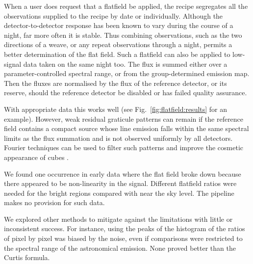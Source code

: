 \documentclass[a4paper,fleqn,usenatbib]{mnras}
\begin{document}
When a user does request that a flatfield be applied, the recipe
segregates all the observations supplied to the recipe by date or
individually.  Although the detector-to-detector response has been
known to vary during the course of a night, far more often it is
stable.  Thus combining observations, such as the two directions of a
weave, or any repeat observations through a night, permits a better
determination of the flat field.  Such a flatfield can also be applied
to low-signal data taken on the same night too.  The flux is summed
either over a parameter-controlled spectral range, or from the
group-determined emission map.  Then the fluxes are normalised by the
flux of the reference detector, or its reserve, should the reference
detector be disabled or has failed quality assurance.

With appropriate data this works well (see
Fig.~\ref{fig:flatfield:results} for an example).  However, weak
residual graticule patterns can remain if the reference field contains
a compact source whose line emission falls within the same spectral
limits as the flux summation and is not observed uniformly by all
detectors.  Fourier techniques can be used to filter such patterns and
improve the cosmetic appearance of cubes \citep{2015MNRAS.447.1996W}.

We found one occurrence in early data where the flat field broke down
because there appeared to be non-linearity in the signal.  Different
flatfield ratios were needed for the bright regions compared with near
the sky level.  The pipeline makes no provision for such data.

We explored other methods to mitigate against the limitations with
little or inconsistent success.  For instance, using the peaks of the
histogram of the ratios of pixel by pixel was biased by the noise,
even if comparisons were restricted to the spectral range of the
astronomical emission.  None proved better than the Curtis formula.
\end{document}
